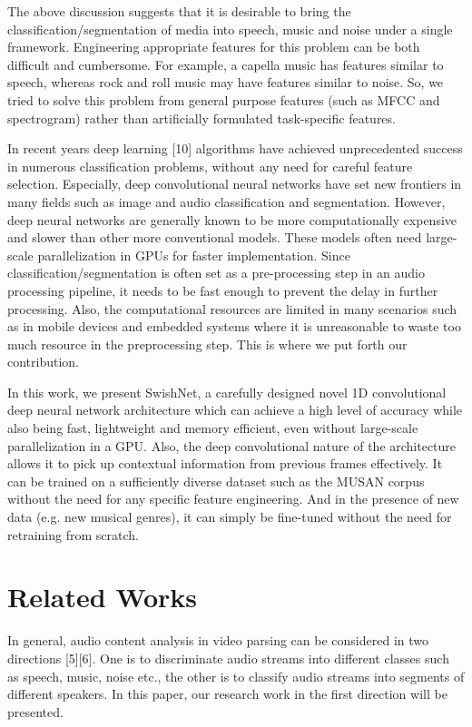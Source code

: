 \documentclass{article}
\begin{document}
The above discussion suggests that it is desirable to bring the classification/segmentation of media into speech, music and noise under a single framework. Engineering appropriate features for this problem can be both difficult and cumbersome. For example, a capella music has features similar to speech, whereas rock and roll music may have features similar to noise. So, we tried to solve this problem from general purpose features (such as MFCC and spectrogram) rather than artificially formulated task-specific features. 

In recent years deep learning [10] algorithms have achieved unprecedented success in numerous classification problems, without any need for careful feature selection. Especially, deep convolutional neural networks have set new frontiers in many fields such as image and audio classification and segmentation. However, deep neural networks are generally known to be more computationally expensive and slower than other more conventional models. These models often need large-scale parallelization in GPUs for faster implementation. Since classification/segmentation is often set as a pre-processing step in an audio processing pipeline, it needs to be fast enough to prevent the delay in further processing. Also, the computational resources are limited in many scenarios such as in mobile devices and embedded systems where it is unreasonable to waste too much resource in the preprocessing step. This is where we put forth our contribution. 

In this work, we present SwishNet, a carefully designed novel 1D convolutional deep neural network architecture which can achieve a high level of accuracy while also being fast, lightweight and memory efficient, even without large-scale parallelization in a GPU. Also, the deep convolutional nature of the architecture allows it to pick up contextual information from previous frames effectively. It can be trained on a sufficiently diverse dataset such as the MUSAN corpus without the need for any specific feature engineering. And in the presence of new data (e.g. new musical genres), it can simply be fine-tuned without the need for retraining from scratch.

\section{Related Works}
In general, audio content analysis in video parsing can be considered in two directions [5][6]. One is to discriminate audio streams into different classes such as speech, music, noise etc., the other is to classify audio streams into segments of different speakers. In this paper, our research work in the first direction will be presented. 
\end{document}
